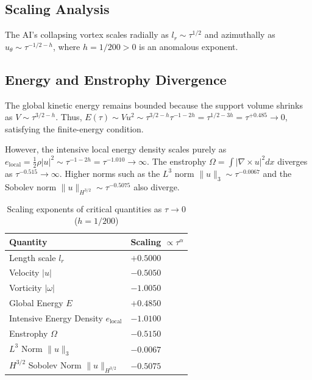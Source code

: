 \documentclass[11pt,a4paper]{article}
\theoremstyle{definition}
\begin{document}
\subsection{Scaling Analysis}
The AI's collapsing vortex scales radially as $l_r \sim \tau^{1/2}$ and azimuthally as $u_\theta \sim \tau^{-1/2-h}$, where $h = 1/200 > 0$ is an anomalous exponent.

\subsection{Energy and Enstrophy Divergence}
The global kinetic energy remains bounded because the support volume shrinks as $V \sim \tau^{3/2-h}$. Thus, $E(\tau) \sim V u^2 \sim \tau^{3/2-h} \tau^{-1-2h} = \tau^{1/2-3h} = \tau^{+0.485} \to 0$, satisfying the finite-energy condition.

However, the intensive local energy density scales purely as $e_{\text{local}} = \frac{1}{2}\rho |u|^2 \sim \tau^{-1-2h} = \tau^{-1.010} \to \infty$. The enstrophy $\Omega = \int |\nabla \times u|^2 dx$ diverges as $\tau^{-0.515} \to \infty$. Higher norms such as the $L^3$ norm $\|u\|_3 \sim \tau^{-0.0067}$ and the Sobolev norm $\|u\|_{H^{3/2}} \sim \tau^{-0.5075}$ also diverge.

\begin{table}[h]
\centering
\caption{Scaling exponents of critical quantities as $\tau \to 0$ ($h = 1/200$)}
\begin{tabular}{@{}ll@{}}
\toprule
Quantity & Scaling $\propto \tau^{\alpha}$ \\
\midrule
Length scale $l_r$ & $+0.5000$ \\
Velocity $|u|$ & $-0.5050$ \\
Vorticity $|\omega|$ & $-1.0050$ \\
Global Energy $E$ & $+0.4850$ \\
Intensive Energy Density $e_{\text{local}}$ & $-1.0100$ \\
Enstrophy $\Omega$ & $-0.5150$ \\
$L^3$ Norm $\|u\|_3$ & $-0.0067$ \\
$H^{3/2}$ Sobolev Norm $\|u\|_{H^{3/2}}$ & $-0.5075$ \\
\bottomrule
\end{tabular}
\end{table}
\end{document}
